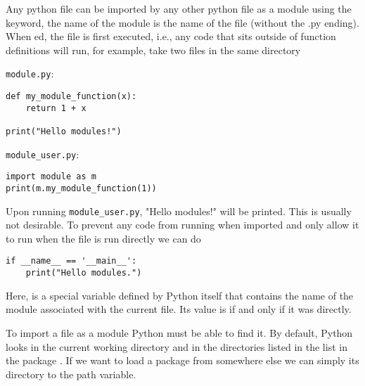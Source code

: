 \begin{syntax}
    Any python file can be imported by any other python file as a module using the  keyword, the name of the module is the name of the file (without the .py ending). When ed, the file is first executed, i.e., any code that sits outside of function definitions will run, for example, take two files in the same directory

    \verb|module.py|:
\begin{lstlisting}
def my_module_function(x):
    return 1 + x

print("Hello modules!")
\end{lstlisting}

    \verb|module_user.py|:
\begin{lstlisting}
import module as m
print(m.my_module_function(1))
\end{lstlisting}

    Upon running \verb|module_user.py|, "Hello modules!" will be printed. This is usually not desirable. To prevent any code from running when imported and only allow it to run when the file is run directly we can do
\begin{lstlisting}
if __name__ == '__main__':
    print("Hello modules.")
\end{lstlisting}
    Here,  is a special variable defined by Python itself that contains the name of the module associated with the current file. Its value is  if and only if it was directly.

    To import a file as a module Python must be able to find it. By default, Python looks in the current working directory  and in the directories listed in the list  in the package . If we want to load a package from somewhere else we can simply  its directory to the path variable.
\end{syntax}